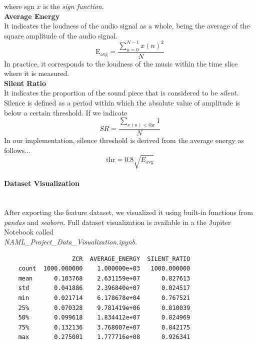 \documentclass[12pt]{article}
\begin{document}
	where sgn $x$ is the \textit{sign function}.\\
	
	\textbf{Average Energy}\\
	It indicates the loudness of the audio signal as a whole, being the average of the square amplitude of the audio signal.
	\begin{equation}
		\text{E}_\text{avg}=\dfrac{\sum_{n=0}^{N-1}{x(n)^2}}{N}
	\end{equation}
	In practice, it corresponds to the loudness of the music within the time slice where it is measured. \\
	
	\textbf{Silent Ratio}\\
	It indicates the proportion of the sound piece that is considered to be \textit{silent}. Silence is defined as a period within which the absolute value of amplitude is below a certain threshold. If we indicate
	\begin{equation}
		SR = \dfrac{\sum_{x(n)<\text{thr}} 1}{N}
	\end{equation}
	In our implementation, silence threshold is derived from the average energy as follows...
	\begin{equation}
		\text{thr}=0.8\sqrt{E_\text{avg}}
	\end{equation}
	\newpage
	
	\paragraph{Dataset Visualization}\mbox{}\\\newline
	After exporting the feature dataset, we visualized it using built-in functions from \textit{pandas} and \textit{seaborn}. Full dataset visualization is available in a the Jupiter Notebook called\\ \textit{NAML\_Project\_Data\_Visualization.ipynb}.
	
	\begin{lstlisting}
    		       ZCR  AVERAGE_ENERGY  SILENT_RATIO
	count  1000.000000    1.000000e+03   1000.000000
	mean      0.103768    2.631159e+07      0.827613
	std       0.041886    2.396840e+07      0.024517
	min       0.021714    6.178678e+04      0.767521 
	25%       0.070328    9.781419e+06      0.810039
	50%       0.099618    1.834412e+07      0.824969
	75%       0.132136    3.768007e+07      0.842175
	max       0.275001    1.777716e+08      0.926341
	\end{lstlisting}
	
\end{document}
